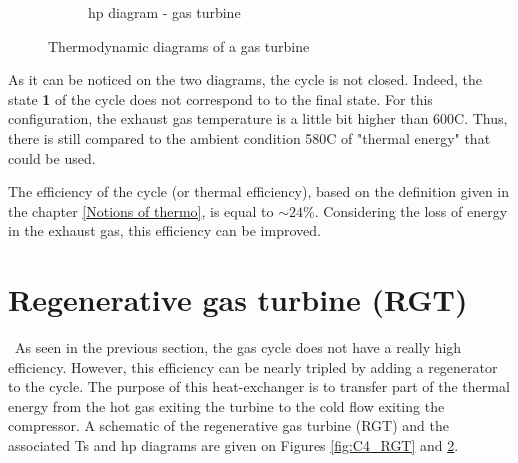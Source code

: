 \begin{figure}[h]
\begin{subfigure}[b]{0.4\textwidth}
         \caption{hp diagram - gas turbine}
         \label{fig:C4_hp_GT}
     \end{subfigure}
        \caption{Thermodynamic diagrams of a gas turbine}
        \label{fig:C4_thermo_diagram_GT}
\end{figure}\newpage


As it can be noticed on the two diagrams, the cycle is not closed. Indeed, the state \textbf{1} of the cycle does not correspond to to the final state. For this configuration, the exhaust gas temperature is a little bit higher than 600\degree C. Thus, there is still compared to the ambient condition 580\degree C of "thermal energy" that could be used.

The efficiency of the cycle (or thermal efficiency), based on the definition given in the chapter \ref{Notions of thermo}, is equal to $\sim 24$\%. Considering the loss of energy in the exhaust gas, this efficiency can be improved.

\section{Regenerative gas turbine (RGT)}
\quad\, As seen in the previous section, the gas cycle does not have a really high efficiency. However, this efficiency can be nearly tripled by adding a regenerator to the cycle. The purpose of this heat-exchanger is to transfer part of the thermal energy from the hot gas exiting the turbine to the cold flow exiting the compressor. A schematic of the regenerative gas turbine (RGT) and the associated Ts and hp diagrams are given on Figures \ref{fig:C4_RGT} and \ref{fig:C4_thermo_diagram_GT}. 

